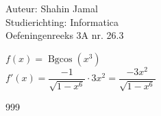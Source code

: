 \documentclass[a4paper]{article}
\begin{document}
  
\noindent \large Auteur: Shahin Jamal \\
\noindent \large Studierichting: Informatica\\
\noindent \large Oefeningenreeks 3A nr. 26.3\\

\medskip

\normalsize

$f(x) = \operatorname{Bgcos}(x^3)$\\

$f'(x) = \dfrac{-1}{\sqrt{1-x^6}} \cdot 3x^2 = \dfrac{-3x^2}{\sqrt{1-x^6}}$\\

\begin{thebibliography}{999}
\end{thebibliography}
\end{document}
